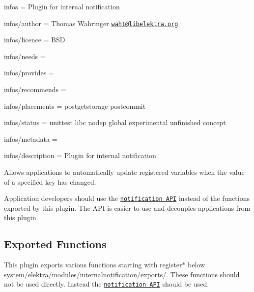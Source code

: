 
\begin{DoxyItemize}
\item infos = Plugin for internal notification
\item infos/author = Thomas Wahringer \href{mailto:waht@libelektra.org}{\tt waht@libelektra.\+org}
\item infos/licence = B\+SD
\item infos/needs =
\item infos/provides =
\item infos/recommends =
\item infos/placements = postgetstorage postcommit
\item infos/status = unittest libc nodep global experimental unfinished concept
\item infos/metadata =
\item infos/description = Plugin for internal notification
\end{DoxyItemize}

Allows applications to automatically update registered variables when the value of a specified key has changed.

Application developers should use the \href{https://doc.libelektra.org/api/current/html/group__kdbnotification.html}{\tt notification A\+PI} instead of the functions exported by this plugin. The A\+PI is easier to use and decouples applications from this plugin.

\subsection*{Exported Functions}

This plugin exports various functions starting with {\ttfamily register$\ast$} below {\ttfamily system/elektra/modules/internalnotification/exports/}. These functions should not be used directly. Instead the \href{https://doc.libelektra.org/api/current/html/group__kdbnotification.html}{\tt notification A\+PI} should be used. 